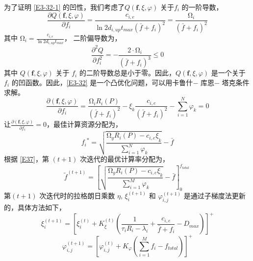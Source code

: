 为了证明 \eqref{E3-32-1} 的凹性，我们考虑了$Q\left(\mathbf{f},\xi,\varphi\right)$ 关于$f_i$ 的一阶导数，
\begin{equation}\label{E34}
\!\!\frac{\partial Q\left(\mathbf{f},\xi,\varphi\right)}{\partial f_i}=\frac{c_{i,e}}{\ln{2} d_{i,up}t_{max}\left(\bar{f}+f_i\right)^2}=\frac{\mathrm{\Omega}_i}{\left(\bar{f}+f_i\right)^2}
\end{equation}
其中 $\mathrm{\Omega}_i=\frac{c_{i,e}}{\ln{2}d_{i,up}t_{max}}$， 二阶偏导数为，
\begin{equation}\label{E35}
\frac{\partial^2Q}{\partial f_i^2}=-\frac{2\cdot\mathrm{\Omega}_i}{\left(\bar{f}+f_i\right)^3}\le0
\end{equation}
其中 $Q\left(\mathbf{f},\xi,\varphi\right)$ 关于 $f_i$ 的二阶导数总是小于零。因此，$Q\left(\mathbf{f},\xi,\varphi\right)$ 是一个关于 $f_i$ 的凹函数。因此，\eqref{E3-32} 是一个凸优化问题，可以用卡鲁什$-$ 库恩$-$ 塔克条件求解。
\begin{equation}\label{E36}
\frac{\partial\left(\mathbf{f},\xi,\varphi\right)}{\partial f_i}=\frac{\mathrm{\Omega}_iR_i\left(P\right)}{\left(\bar{f}+f_i\right)^2}-\xi_k\frac{c_{i,e}}{\left(\bar{f}+f_i\right)^2}-\sum_{i=1}^{N}\varphi_k=0
\end{equation}
让$\frac{\partial \left(\mathbf{f},\xi,\varphi\right)}{\partial f_i}=0$，最佳计算资源分配为，
\begin{equation}\label{E37}
{f_i}^\ast=\sqrt{\frac{\mathrm{\Omega}_yR_i\left(P\right)-{c_{i,e}\xi}_k}{\sum_{i=1}^{N}\varphi_k}}-\bar{f}
\end{equation}
根据 \eqref{E37}，第 $(t+1)$ 次迭代的最优计算率分配为，
\begin{equation}\label{E38}
{\tilde{f}}^{\left(t+1\right)}=\left[\sqrt{\frac{\mathrm{\Omega}_yR_i\left(P\right)
-{c_{i,e}\xi}_k}{\sum_{i=1}^{M}\varphi_k}}-\bar{f}\right]_0^{f_{total}\ }
\end{equation}
第$(t+1)$ 次迭代时的拉格朗日乘数 $\eta$, $\xi_i^{\left(t+1\right)}$ 和 $\varphi_{i,j}^{\left(t+1\right)}$ 是通过子梯度法更新的，具体方法如下，
\begin{equation}\label{E39}
\xi_i^{\left(t+1\right)}=\left[\xi_i^{\left(t\right)}\!+\!K_\xi^{\left(t\right)}\!\left(\frac{1}{\tau_iR_i
-\lambda_i}\!+\!\frac{c_{i,e}}{\bar{f}+f_i}\!-\!D_{max}\!\right)\!\right]^+
\end{equation}
\begin{equation}
\varphi_{i,j}^{\left(t+1\right)}=\left[\varphi_{i,j}^{\left(t\right)}+K_\varphi\left(\sum_{i=1}^{M}f_i
-f_{total}\right)\right]^+
\end{equation}

